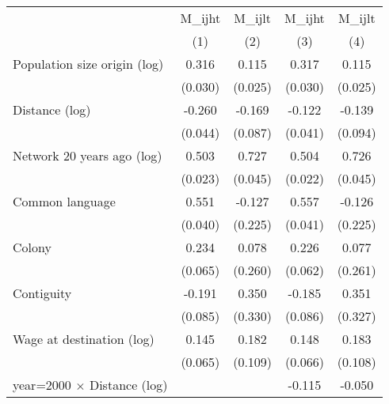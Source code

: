 \begin{tabular}{l*{4}{c}} \toprule
                &\multicolumn{1}{c}{M\_{ijht}}&\multicolumn{1}{c}{M\_{ijlt}}&\multicolumn{1}{c}{M\_{ijht}}&\multicolumn{1}{c}{M\_{ijlt}}\\\cmidrule(lr){2-2}\cmidrule(lr){3-3}\cmidrule(lr){4-4}\cmidrule(lr){5-5}
                &\multicolumn{1}{c}{(1)}         &\multicolumn{1}{c}{(2)}         &\multicolumn{1}{c}{(3)}         &\multicolumn{1}{c}{(4)}         \\
\midrule
Population size origin (log)&    0.316\sym{***}&    0.115\sym{***}&    0.317\sym{***}&    0.115\sym{***}\\
                &  (0.030)         &  (0.025)         &  (0.030)         &  (0.025)         \\
\addlinespace
Distance (log)  &   -0.260\sym{***}&   -0.169\sym{*}  &   -0.122\sym{***}&   -0.139         \\
                &  (0.044)         &  (0.087)         &  (0.041)         &  (0.094)         \\
\addlinespace
Network 20 years ago (log)&    0.503\sym{***}&    0.727\sym{***}&    0.504\sym{***}&    0.726\sym{***}\\
                &  (0.023)         &  (0.045)         &  (0.022)         &  (0.045)         \\
\addlinespace
Common language &    0.551\sym{***}&   -0.127         &    0.557\sym{***}&   -0.126         \\
                &  (0.040)         &  (0.225)         &  (0.041)         &  (0.225)         \\
\addlinespace
Colony          &    0.234\sym{***}&    0.078         &    0.226\sym{***}&    0.077         \\
                &  (0.065)         &  (0.260)         &  (0.062)         &  (0.261)         \\
\addlinespace
Contiguity      &   -0.191\sym{**} &    0.350         &   -0.185\sym{**} &    0.351         \\
                &  (0.085)         &  (0.330)         &  (0.086)         &  (0.327)         \\
\addlinespace
Wage at destination (log)&    0.145\sym{**} &    0.182\sym{*}  &    0.148\sym{**} &    0.183\sym{*}  \\
                &  (0.065)         &  (0.109)         &  (0.066)         &  (0.108)         \\
\addlinespace
year=2000 $\times$ Distance (log)&                  &                  &   -0.115\sym{***}&   -0.050\sym{**} \\

\end{tabular}
